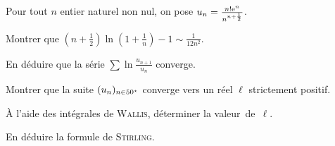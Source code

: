 \begin{exercice}
Pour tout $n$ entier naturel non nul, on pose $u_n = \frac{n! \mathrm{e}^n}{n^{n + \frac{1}{2}}}$.
\begin{questions}
\item Montrer que $\left(n + \frac{1}{2}\right) \ln\mathopen{}\left(1 + \frac{1}{n}\right) - 1\sim \frac{1}{12 n^2}$.

\item En déduire que la série $\sum \ln \frac{u_{n+1}}{u_n}$ converge.

\item Montrer que la suite $(u_n)_{n\in50^\star}$ converge vers un réel $\ell$ strictement positif.

\item À l'aide des intégrales de \textsc{Wallis}, déterminer la valeur~de~$\ell$.

\item En déduire la formule de \textsc{Stirling}.
\end{questions}
\end{exercice}

